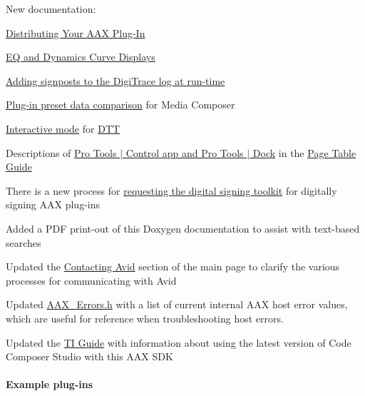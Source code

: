 \begin{DoxyItemize}
\item New documentation\+: 
\begin{DoxyItemize}
\item \hyperlink{a00372}{Distributing Your A\+A\+X Plug-\/\+In} 
\item \hyperlink{a00342}{E\+Q and Dynamics Curve Displays} 
\item \hyperlink{a00364_digitrace__signposting}{Adding signposts to the Digi\+Trace log at run-\/time} 
\item \hyperlink{a00361_subsubsection__aax_media_composer_guide__features__presets__comparison}{Plug-\/in preset data comparison} for Media Composer 
\item \hyperlink{a00366_dtt_guide_04_interactive_mode}{Interactive mode} for \hyperlink{a00366}{D\+T\+T} 
\item Descriptions of \hyperlink{a00363_subsubsection__avid_ptcontrol}{Pro Tools $\vert$ Control app and Pro Tools $\vert$ Dock} in the \hyperlink{a00363}{Page Table Guide} 
\end{DoxyItemize}
\item There is a new process for \hyperlink{a00360_subsection__digital_signature_}{requesting the digital signing toolkit} for digitally signing A\+A\+X plug-\/ins 
\item Added a P\+D\+F print-\/out of this Doxygen documentation to assist with text-\/based searches  
\item Updated the \hyperlink{a00323_contact}{Contacting Avid} section of the main page to clarify the various processes for communicating with Avid  
\item Updated \hyperlink{a00207}{A\+A\+X\+\_\+\+Errors.\+h} with a list of current internal A\+A\+X host error values, which are useful for reference when troubleshooting host errors.  
\item Updated the \hyperlink{a00362}{T\+I Guide} with information about using the latest version of Code Composer Studio with this A\+A\+X S\+D\+K  
\end{DoxyItemize}\hypertarget{a00375_aax_sdk_2p3p0_ExamplePlugIns}{}\paragraph{Example plug-\/ins}\label{a00375_aax_sdk_2p3p0_ExamplePlugIns}

